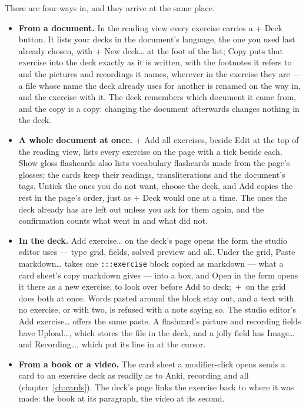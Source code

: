 \documentclass[11pt,oneside]{report}
\newcommand{\key}[1]{\textsf{\small\fbox{#1}}}
\newcommand{\menu}[1]{\textsf{#1}}
\begin{document}
There are four ways in, and they arrive at the same place.

\begin{itemize}
\item \textbf{From a document.} In the reading view every exercise carries a
  \menu{+ Deck} button. It lists your decks in the document's language, the
  one you used last already chosen, with \menu{+ New deck\ldots} at the foot
  of the list; \menu{Copy} puts that exercise into the deck exactly as it is
  written, with the footnotes it refers to and the pictures and recordings it
  names, wherever in the exercise they are --- a file whose name the deck
  already uses for another is renamed on the way in, and the exercise with
  it. The
  deck remembers which document it came from, and the copy is a copy:
  changing the document afterwards changes nothing in the deck.
\item \textbf{A whole document at once.} \menu{+ Add all exercises}, beside
  \menu{Edit} at the top of the reading view, lists every exercise on the page
  with a tick beside each. \menu{Show gloss flashcards} also lists vocabulary
  flashcards made from the page's glosses; the cards keep their readings,
  transliterations and the document's tags. Untick the ones you do not want, choose the deck,
  and \menu{Add} copies the rest in the page's order, just as \menu{+ Deck}
  would one at a time. The ones the deck already has are left out unless you
  ask for them again, and the confirmation counts what went in and what did
  not.
\item \textbf{In the deck.} \menu{Add exercise\ldots} on the deck's page
  opens the form the studio editor uses --- type grid, fields, solved preview
  and all. Under the grid, \menu{Paste markdown\ldots} takes one
  \texttt{:::exercise} block copied as markdown --- what a card sheet's
  \menu{copy markdown} gives --- into a box, and \menu{Open in the form}
  opens it there as a new exercise, to look over before \menu{Add to deck};
  \key{Ctrl}\,+\,\key{V} on the grid does both at once. Words pasted around
  the block stay out, and a text with no exercise, or with two, is refused
  with a note saying so. The studio editor's \menu{Add exercise\ldots} offers
  the same paste. A flashcard's picture and recording fields have
  \menu{Upload\ldots}, which stores the file in the deck, and a jolly
  field has \menu{Image\ldots} and \menu{Recording\ldots}, which put its
  line in at the cursor.
\item \textbf{From a book or a video.} The card sheet a modifier-click opens
  sends a card to an exercise deck as readily as to Anki, recording and all
  (chapter~\ref{ch:cards}). The deck's page links the exercise back to where
  it was made: the book at its paragraph, the video at its second.
\end{itemize}
\end{document}
